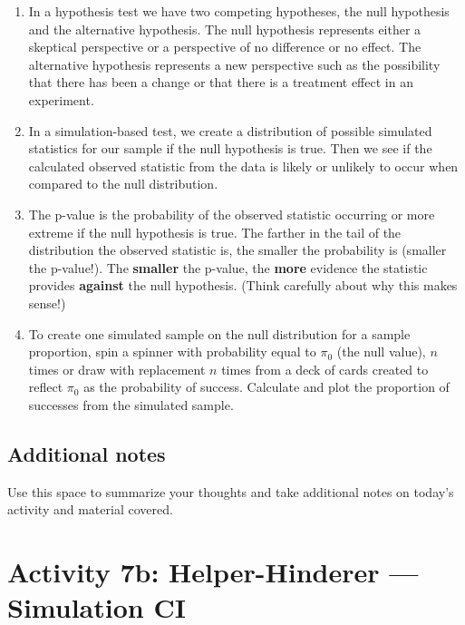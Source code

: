 \documentclass[
]{report}
\begin{document}
\begin{enumerate}
\def\labelenumi{\arabic{enumi}.}
\item
  In a hypothesis test we have two competing hypotheses, the null hypothesis and the alternative hypothesis. The null hypothesis represents either a skeptical perspective or a perspective of no difference or no effect. The alternative hypothesis represents a new perspective such as the possibility that there has been a change or that there is a treatment effect in an experiment.
\item
  In a simulation-based test, we create a distribution of possible simulated statistics for our sample if the null hypothesis is true. Then we see if the calculated observed statistic from the data is likely or unlikely to occur when compared to the null distribution.
\item
  The p-value is the probability of the observed statistic occurring or more extreme if the null hypothesis is true. The farther in the tail of the distribution the observed statistic is, the smaller the probability is (smaller the p-value!). The \textbf{smaller} the p-value, the \textbf{more} evidence the statistic provides \textbf{against} the null hypothesis. (Think carefully about why this makes sense!)
\item
  To create one simulated sample on the null distribution for a sample proportion, spin a spinner with probability equal to \(\pi_0\) (the null value), \(n\) times or draw with replacement \(n\) times from a deck of cards created to reflect \(\pi_0\) as the probability of success. Calculate and plot the proportion of successes from the simulated sample.
\end{enumerate}

\hypertarget{additional-notes-9}{%
\subsection{Additional notes}\label{additional-notes-9}}

Use this space to summarize your thoughts and take additional notes on today's activity and material covered.

\newpage

\hypertarget{activity-7b-helper-hinderer-simulation-ci}{%
\section{Activity 7b: Helper-Hinderer --- Simulation CI}\label{activity-7b-helper-hinderer-simulation-ci}}
\end{document}
